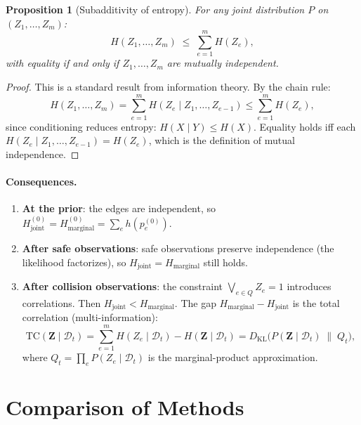 \documentclass[11pt]{article}
\newtheorem{proposition}{Proposition}
\begin{document}
\begin{proposition}[Subadditivity of entropy]
\label{prop:subadditivity}
For any joint distribution $P$ on $(Z_1, \dots, Z_m)$:
\[
  H(Z_1, \dots, Z_m) \;\leq\; \sum_{e=1}^{m} H(Z_e),
\]
with equality if and only if $Z_1, \dots, Z_m$ are mutually independent.
\end{proposition}

\begin{proof}
This is a standard result from information theory.  By the chain rule:
\[
  H(Z_1, \dots, Z_m) = \sum_{e=1}^{m} H(Z_e \mid Z_1, \dots, Z_{e-1})
  \leq \sum_{e=1}^{m} H(Z_e),
\]
since conditioning reduces entropy: $H(X \mid Y) \leq H(X)$.  Equality
holds iff each $H(Z_e \mid Z_1, \dots, Z_{e-1}) = H(Z_e)$, which is the
definition of mutual independence.
\end{proof}

\paragraph{Consequences.}
\begin{enumerate}
  \item \textbf{At the prior}: the edges are independent, so
    $H_{\text{joint}}^{(0)} = H_{\text{marginal}}^{(0)} = \sum_e h(p_e^{(0)})$.
  \item \textbf{After safe observations}: safe observations preserve
    independence (the likelihood factorizes), so
    $H_{\text{joint}} = H_{\text{marginal}}$ still holds.
  \item \textbf{After collision observations}: the constraint
    $\bigvee_{e \in Q} Z_e = 1$ introduces correlations.  Then
    $H_{\text{joint}} < H_{\text{marginal}}$.  The gap
    $H_{\text{marginal}} - H_{\text{joint}}$ is the total correlation
    (multi-information):
    \begin{equation}
      \mathrm{TC}(\mathbf{Z} \mid \mathcal{D}_t)
      = \sum_{e=1}^m H(Z_e \mid \mathcal{D}_t) - H(\mathbf{Z} \mid \mathcal{D}_t)
      = D_{\mathrm{KL}}\!\bigl(P(\mathbf{Z} \mid \mathcal{D}_t) \;\|\; Q_t\bigr),
      \label{eq:total-correlation}
    \end{equation}
    where $Q_t = \prod_e P(Z_e \mid \mathcal{D}_t)$ is the
    marginal-product approximation.
\end{enumerate}

\section{Comparison of Methods}
\label{sec:comparison}
\end{document}
